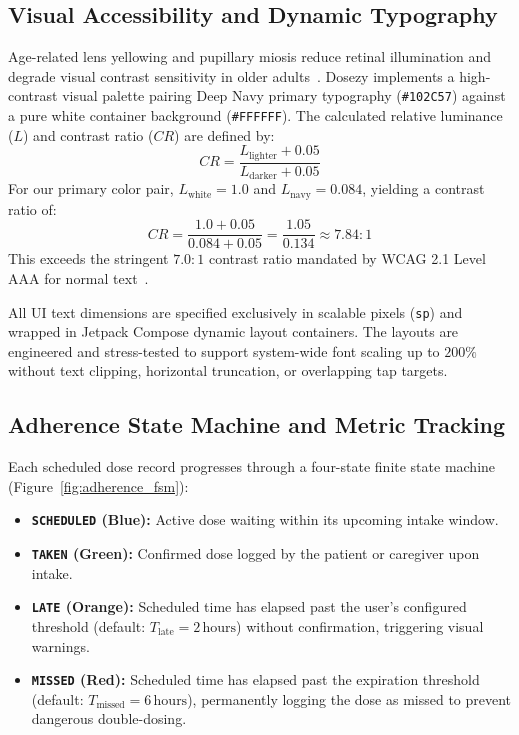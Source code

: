 \documentclass[11pt,a4paper]{article}
\begin{document}
\subsection{Visual Accessibility and Dynamic Typography}

Age-related lens yellowing and pupillary miosis reduce retinal illumination and degrade visual contrast sensitivity in older adults~\cite{fisk2009designing}. Dosezy implements a high-contrast visual palette pairing Deep Navy primary typography (\texttt{\#102C57}) against a pure white container background (\texttt{\#FFFFFF}). The calculated relative luminance ($L$) and contrast ratio ($CR$) are defined by:
\begin{equation}
    CR = \frac{L_{\text{lighter}} + 0.05}{L_{\text{darker}} + 0.05}
\end{equation}
For our primary color pair, $L_{\text{white}} = 1.0$ and $L_{\text{navy}} = 0.084$, yielding a contrast ratio of:
\begin{equation}
    CR = \frac{1.0 + 0.05}{0.084 + 0.05} = \frac{1.05}{0.134} \approx 7.84:1
\end{equation}
This exceeds the stringent $7.0:1$ contrast ratio mandated by WCAG 2.1 Level AAA for normal text~\cite{w3c2018wcag}.

All UI text dimensions are specified exclusively in scalable pixels (\texttt{sp}) and wrapped in Jetpack Compose dynamic layout containers. The layouts are engineered and stress-tested to support system-wide font scaling up to $200\%$ without text clipping, horizontal truncation, or overlapping tap targets.

\subsection{Adherence State Machine and Metric Tracking}

Each scheduled dose record progresses through a four-state finite state machine (Figure~\ref{fig:adherence_fsm}):
\begin{itemize}[leftmargin=*]
    \item \textbf{\texttt{SCHEDULED} (Blue):} Active dose waiting within its upcoming intake window.
    \item \textbf{\texttt{TAKEN} (Green):} Confirmed dose logged by the patient or caregiver upon intake.
    \item \textbf{\texttt{LATE} (Orange):} Scheduled time has elapsed past the user's configured threshold (default: $T_{\text{late}} = 2\,\text{hours}$) without confirmation, triggering visual warnings.
    \item \textbf{\texttt{MISSED} (Red):} Scheduled time has elapsed past the expiration threshold (default: $T_{\text{missed}} = 6\,\text{hours}$), permanently logging the dose as missed to prevent dangerous double-dosing.
\end{itemize}
\end{document}
